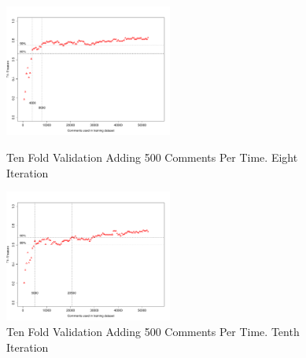 \begin{figure}[thb!]
  \centering
  \vspace{-93mm}
  \includegraphics[width=0.49\textwidth]{figures/appendix/ten_fold_validation_requirement/ten_fold_validation_7_500.pdf}
  \vspace{-5mm}
  \caption{Ten Fold Validation Adding 500 Comments Per Time. Eight Iteration}
  \label{fig:requirement_ten_fold_validation_7_100}
  \includegraphics[width=0.49\textwidth]{figures/appendix/ten_fold_validation_requirement/ten_fold_validation_9_500.pdf}
  \vspace{-5mm}
  \caption{Ten Fold Validation Adding 500 Comments Per Time. Tenth Iteration}
  \label{fig:requirement_ten_fold_validation_9_100}
  
\end{figure}









